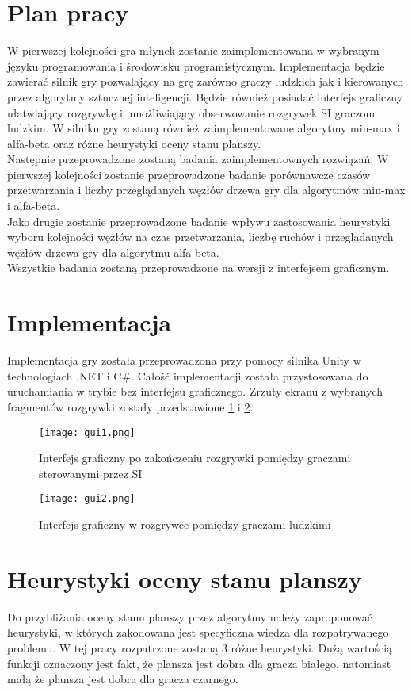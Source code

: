 \documentclass{article}
\begin{document}
	\section{Plan pracy}
	W pierwszej kolejności gra młynek zostanie zaimplementowana w wybranym języku programowania i środowisku programistycznym. Implementacja będzie zawierać silnik gry pozwalający na grę zarówno graczy ludzkich jak i kierowanych przez algorytmy sztucznej inteligencji. Będzie również posiadać interfejs graficzny ułatwiający rozgrywkę i umożliwiający obserwowanie rozgrywek SI graczom ludzkim. W silniku gry zostaną również zaimplementowane algorytmy min-max i alfa-beta oraz różne heurystyki oceny stanu planszy.\\
	Następnie przeprowadzone zostaną badania zaimplementownych rozwiązań. W pierwszej kolejności zostanie przeprowadzone badanie porównawcze czasów przetwarzania i liczby przeglądanych węzłów drzewa gry dla algorytmów min-max i alfa-beta.\\
	Jako drugie zostanie przeprowadzone badanie wpływu zastosowania heurystyki wyboru kolejności węzłów na czas przetwarzania, liczbę ruchów i przeglądanych węzłów drzewa gry dla algorytmu alfa-beta.\\
	Wszystkie badania zostaną przeprowadzone na wersji z interfejsem graficznym.
	\section{Implementacja}
	Implementacja gry została przeprowadzona przy pomocy silnika Unity w technologiach .NET i C\#. Całość implementacji została przystosowana do uruchamiania w trybie bez interfejsu graficznego. Zrzuty ekranu z wybranych fragmentów rozgrywki zostały przedstawione \ref{fig:gui1} i \ref{fig:gui2}.
	\begin{figure}[H]
		\centering
		\texttt{[image: gui1.png]}
		\caption{Interfejs graficzny po zakończeniu rozgrywki pomiędzy graczami sterowanymi przez SI}
		\label{fig:gui1}
	\end{figure}
	\begin{figure}[H]
		\centering
		\texttt{[image: gui2.png]}
		\caption{Interfejs graficzny w rozgrywce pomiędzy graczami ludzkimi}
		\label{fig:gui2}
	\end{figure}
	\section{Heurystyki oceny stanu planszy}
	Do przybliżania oceny stanu planszy przez algorytmy należy zaproponować heurystyki, w których zakodowana jest specyficzna wiedza dla rozpatrywanego problemu. W tej pracy rozpatrzone zostaną 3 różne heurystyki. Dużą wartością funkcji oznaczony jest fakt, że plansza jest dobra dla gracza białego, natomiast małą że plansza jest dobra dla gracza czarnego.
\end{document}
